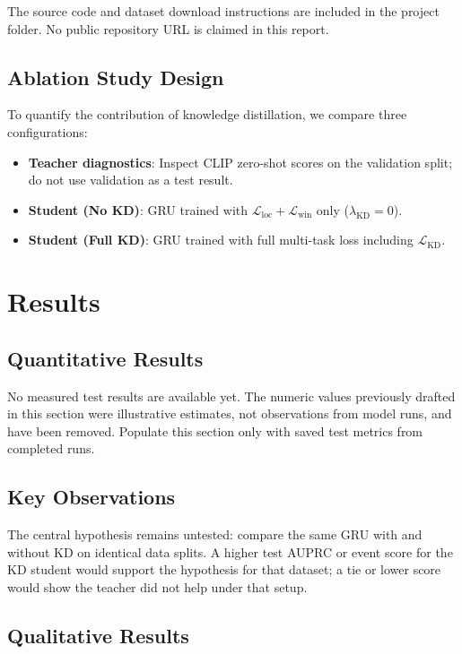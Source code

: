 \documentclass[10pt,twocolumn]{article}
\begin{document}
The source code and dataset download instructions are included in the project folder. No public repository URL is claimed in this report.

\subsection{Ablation Study Design}

To quantify the contribution of knowledge distillation, we compare three configurations:
\begin{itemize}[leftmargin=*, itemsep=1pt]
    \item \textbf{Teacher diagnostics}: Inspect CLIP zero-shot scores on the validation split; do not use validation as a test result.
    \item \textbf{Student (No KD)}: GRU trained with $\mathcal{L}_{\text{loc}} + \mathcal{L}_{\text{win}}$ only ($\lambda_{\text{KD}} = 0$).
    \item \textbf{Student (Full KD)}: GRU trained with full multi-task loss including $\mathcal{L}_{\text{KD}}$.
\end{itemize}

\section{Results}
\label{sec:results}

\subsection{Quantitative Results}

No measured test results are available yet. The numeric values previously drafted in this section were illustrative estimates, not observations from model runs, and have been removed. Populate this section only with saved test metrics from completed runs.

\subsection{Key Observations}

The central hypothesis remains untested: compare the same GRU with and without KD on identical data splits. A higher test AUPRC or event score for the KD student would support the hypothesis for that dataset; a tie or lower score would show the teacher did not help under that setup.

\subsection{Qualitative Results}
\end{document}
